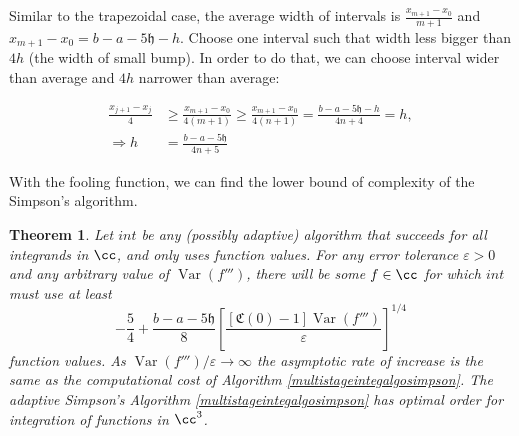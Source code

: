 \documentclass{iitthesis}
\DeclareMathOperator{\Var}{Var}
\newtheorem{theorem}{Theorem}
\theoremstyle{definition}
\theoremstyle{remark}
\begin{document}
Similar to the trapezoidal case, the average width of intervals is $\frac{x_{m+1}-x_{0}}{m+1}$ and $x_{m+1}-x_{0}=b-a-5\mathfrak{h}-h$. Choose one interval such that width less bigger than $4h$ (the width of small bump). In order to do that, we can choose interval wider than average and $4h$ narrower than average:

  \begin{align*}
    \frac{x_{j+1}-x_{j}}{4}&\ge\frac{x_{m+1}-x_{0}}{4(m+1)}\ge\frac{x_{m+1}-x_{0}}{4(n+1)}=\frac{b-a-5\mathfrak{h}-h}{4n+4}=h,\\
    \Rightarrow h&=\frac{b-a-5\mathfrak{h}}{4n+5}
  \end{align*}

With the fooling function, we can find the lower bound of complexity of the Simpson's algorithm.
\begin{theorem}\label{compsim}
    Let $int$ be any (possibly adaptive) algorithm that succeeds for all integrands in $\cc$, and only uses function values. For any error tolerance $\varepsilon > 0$ and any arbitrary value of $\Var(f''')$, there will be some $f\in \cc$ for which $int$ must use at least
    \begin{equation}\label{complowbdsim}
        -\frac{5}{4}+\frac{b-a-5\mathfrak{h}}{8}\left[\frac{[\mathfrak{C}(0)-1]\Var( f''')}{\varepsilon}\right]^{1/4}
    \end{equation}
    function values. As $\Var(f''')/\varepsilon \rightarrow \infty$ the asymptotic rate of increase is the same as the computational cost of Algorithm \ref{multistageintegalgosimpson}. The adaptive Simpson's Algorithm \ref{multistageintegalgosimpson} has optimal order for integration of functions in $\cc^3$.
\end{theorem}
\end{document}
